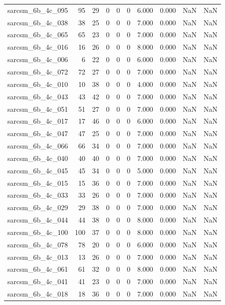 \documentclass{article}
\begin{document}
\begin{longtable}{lrrrrrrrrr}
sarcsm\_6b\_4c\_095 & 95 & 29 & 0 & 0 & 0 & 6.000 & 0.000 & NaN & NaN \\
sarcsm\_6b\_4c\_038 & 38 & 25 & 0 & 0 & 0 & 7.000 & 0.000 & NaN & NaN \\
sarcsm\_6b\_4c\_065 & 65 & 23 & 0 & 0 & 0 & 7.000 & 0.000 & NaN & NaN \\
sarcsm\_6b\_4c\_016 & 16 & 26 & 0 & 0 & 0 & 8.000 & 0.000 & NaN & NaN \\
sarcsm\_6b\_4c\_006 & 6 & 22 & 0 & 0 & 0 & 6.000 & 0.000 & NaN & NaN \\
sarcsm\_6b\_4c\_072 & 72 & 27 & 0 & 0 & 0 & 7.000 & 0.000 & NaN & NaN \\
sarcsm\_6b\_4c\_010 & 10 & 38 & 0 & 0 & 0 & 4.000 & 0.000 & NaN & NaN \\
sarcsm\_6b\_4c\_043 & 43 & 42 & 0 & 0 & 0 & 7.000 & 0.000 & NaN & NaN \\
sarcsm\_6b\_4c\_051 & 51 & 27 & 0 & 0 & 0 & 7.000 & 0.000 & NaN & NaN \\
sarcsm\_6b\_4c\_017 & 17 & 46 & 0 & 0 & 0 & 6.000 & 0.000 & NaN & NaN \\
sarcsm\_6b\_4c\_047 & 47 & 25 & 0 & 0 & 0 & 7.000 & 0.000 & NaN & NaN \\
sarcsm\_6b\_4c\_066 & 66 & 34 & 0 & 0 & 0 & 7.000 & 0.000 & NaN & NaN \\
sarcsm\_6b\_4c\_040 & 40 & 40 & 0 & 0 & 0 & 7.000 & 0.000 & NaN & NaN \\
sarcsm\_6b\_4c\_045 & 45 & 34 & 0 & 0 & 0 & 5.000 & 0.000 & NaN & NaN \\
sarcsm\_6b\_4c\_015 & 15 & 36 & 0 & 0 & 0 & 7.000 & 0.000 & NaN & NaN \\
sarcsm\_6b\_4c\_033 & 33 & 26 & 0 & 0 & 0 & 7.000 & 0.000 & NaN & NaN \\
sarcsm\_6b\_4c\_029 & 29 & 38 & 0 & 0 & 0 & 7.000 & 0.000 & NaN & NaN \\
sarcsm\_6b\_4c\_044 & 44 & 38 & 0 & 0 & 0 & 8.000 & 0.000 & NaN & NaN \\
sarcsm\_6b\_4c\_100 & 100 & 37 & 0 & 0 & 0 & 8.000 & 0.000 & NaN & NaN \\
sarcsm\_6b\_4c\_078 & 78 & 20 & 0 & 0 & 0 & 6.000 & 0.000 & NaN & NaN \\
sarcsm\_6b\_4c\_013 & 13 & 26 & 0 & 0 & 0 & 7.000 & 0.000 & NaN & NaN \\
sarcsm\_6b\_4c\_061 & 61 & 32 & 0 & 0 & 0 & 8.000 & 0.000 & NaN & NaN \\
sarcsm\_6b\_4c\_041 & 41 & 23 & 0 & 0 & 0 & 7.000 & 0.000 & NaN & NaN \\
sarcsm\_6b\_4c\_018 & 18 & 36 & 0 & 0 & 0 & 7.000 & 0.000 & NaN & NaN \\

\end{longtable}
\end{document}
